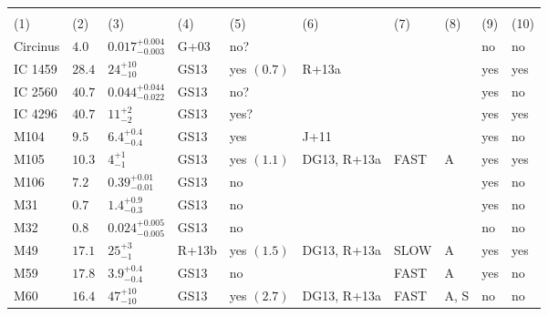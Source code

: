 \begin{table*}
\begin{center}
\begin{tabular}{llllllllll}
\multicolumn{1}{l}{} &                                
\multicolumn{1}{l}{} &                                
\multicolumn{1}{l}{} &                                
\multicolumn{1}{l}{} \\                             
\multicolumn{1}{l}{(1)} &                             
\multicolumn{1}{l}{(2)} &                             
\multicolumn{1}{l}{(3)} &                             
\multicolumn{1}{l}{(4)} &                             
\multicolumn{1}{l}{(5)} &                             
\multicolumn{1}{l}{(6)} &                             
\multicolumn{1}{l}{(7)} &                             
\multicolumn{1}{l}{(8)} &                             
\multicolumn{1}{l}{(9)} &                             
\multicolumn{1}{l}{(10)} \\                         
\hline                                                
Circinus   &  $4.0$  &  $0.017_{-0.003}^{+0.004}$   &  G+03  &  no?  &     &      &     &  no  &  no  \\ 
IC 1459  &  $28.4$  &  $24_{-10}^{+10}$   &  GS13  &  yes  $(0.7)$  &  R+13a  &      &     &  yes  &  yes  \\ 
IC 2560  &  $40.7$  &  $0.044_{-0.022}^{+0.044}$   &  GS13  &  no?  &     &      &     &  yes  &  no  \\ 
IC 4296  &  $40.7$  &  $11_{-2}^{+2}$   &  GS13  &  yes?  &     &      &     &  yes  &  yes  \\ 
M104  &  $9.5$  &  $6.4_{-0.4}^{+0.4}$   &  GS13  &  yes   &  J+11  &      &     &  yes  &  no  \\ 
M105  &  $10.3$  &  $4_{-1}^{+1}$   &  GS13  &  yes  $(1.1)$  &  DG13, R+13a  &  FAST   &  A  &  yes  &  yes  \\ 
M106  &  $7.2$  &  $0.39_{-0.01}^{+0.01}$   &  GS13  &  no   &     &      &     &  yes  &  no  \\ 
M31  &  $0.7$  &  $1.4_{-0.3}^{+0.9}$   &  GS13  &  no   &     &      &     &  yes  &  no  \\ 
M32  &  $0.8$  &  $0.024_{-0.005}^{+0.005}$   &  GS13  &  no   &     &      &     &  no  &  no  \\ 
M49  &  $17.1$  &  $25_{-1}^{+3}$   &  R+13b  &  yes  $(1.5)$  &  DG13, R+13a  &   SLOW  &  A  &  yes  &  yes  \\ 
M59  &  $17.8$  &  $3.9_{-0.4}^{+0.4}$   &  GS13  &  no   &     &  FAST   &  A  &  yes  &  no  \\ 
M60  &  $16.4$  &  $47_{-10}^{+10}$   &  GS13  &  yes  $(2.7)$  &  DG13, R+13a  &  FAST   &  A, S  &  no  &  no  \\ 

\end{tabular}
\end{center}
\end{table*}
